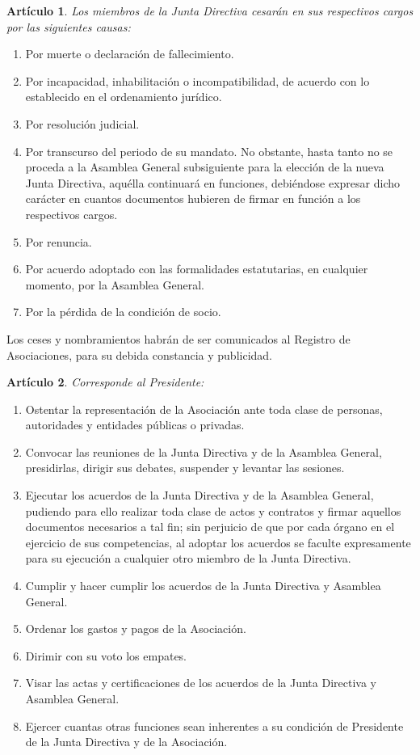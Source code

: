 \documentclass[a4paper,12pt]{article}
\theoremstyle{mystyle}		%
\newtheorem{art}{Artículo}	%
\begin{document}
\begin{onehalfspace}
\begin{art}
Los miembros de la Junta Directiva cesarán en sus respectivos cargos por las siguientes causas:
\end{art}
\begin{enumerate}[label={\alph*)}]
 \item Por muerte o declaración de fallecimiento.
 \item Por incapacidad, inhabilitación o incompatibilidad, de acuerdo con lo establecido en el ordenamiento jurídico.
 \item Por resolución judicial.
 \item Por transcurso del periodo de su mandato. No obstante, hasta tanto no se proceda a la Asamblea General subsiguiente para la elección de la nueva Junta Directiva, aquélla continuará en funciones, debiéndose expresar dicho carácter en cuantos documentos hubieren de firmar en función a los respectivos cargos.
 \item Por renuncia.
 \item Por acuerdo adoptado con las formalidades estatutarias, en cualquier momento, por la Asamblea General.
 \item Por la pérdida de la condición de socio.
\end{enumerate}

Los ceses y nombramientos habrán de ser comunicados al Registro de Asociaciones, para su debida constancia y publicidad.

\begin{art}
Corresponde al Presidente:
\end{art}
\begin{enumerate}[label={\alph*)}]
 \item Ostentar la representación de la Asociación ante toda clase de personas, autoridades y entidades públicas o privadas.
 \item Convocar las reuniones de la Junta Directiva y de la Asamblea General, presidirlas, dirigir sus debates, suspender y levantar las sesiones.
 \item Ejecutar los acuerdos de la Junta Directiva y de la Asamblea General, pudiendo para ello realizar toda clase de actos y contratos y firmar aquellos documentos necesarios a tal fin; sin perjuicio de que por cada órgano en el ejercicio de sus competencias, al adoptar los acuerdos se faculte expresamente para su ejecución a cualquier otro miembro de la Junta Directiva.
 \item Cumplir y hacer cumplir los acuerdos de la Junta Directiva y Asamblea General.
 \item Ordenar los gastos y pagos de la Asociación.
 \item Dirimir con su voto los empates.
 \item Visar las actas y certificaciones de los acuerdos de la Junta Directiva y Asamblea General.
 \item Ejercer cuantas otras funciones sean inherentes a su condición de Presidente de la Junta Directiva y de la Asociación.
\end{enumerate}


\end{onehalfspace}
\end{document}
